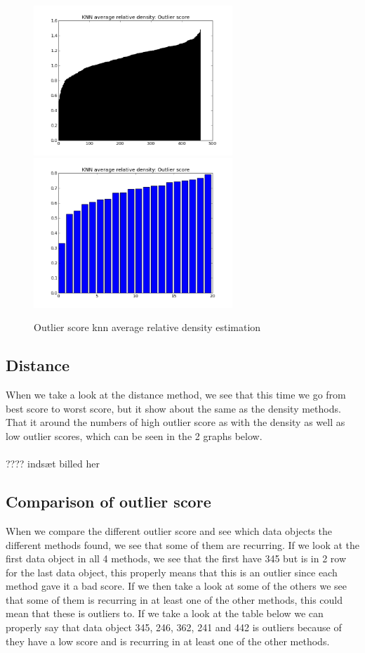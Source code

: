 \begin{figure}[H]
\centering
\includegraphics[width=7.5cm, keepaspectratio=true]{pictures/knnAvgdensityEstimationAll.png}
\includegraphics[width=7.5cm, keepaspectratio=true]{pictures/knnAvgdensityEstimation20.png}
\vspace{-0.4cm}
\caption{\footnotesize Outlier score knn average relative density estimation}
\label{avg}
\end{figure}

\subsection{Distance}

When we take a look at the distance method, we see that this time we go from best score to worst score, but it show about the same as the density methods. That it around the numbers of high outlier score as with the density as well as low outlier scores, which can be seen in the 2 graphs below.
\\\\
???? indsæt billed her

\subsection{Comparison of outlier score}

When we compare the different outlier score and see which data objects the different methods found, we see that some of them are recurring. If we look at the first data object in all 4 methods, we see that the first have 345 but is in 2 row for the last data object, this properly means that this is an outlier since each method gave it a bad score. If we then take a look at some of the others we see that some of them is recurring in at least one of the other methods, this could mean that these is outliers to. If we take a look at the table below we can properly say that data object 345, 246, 362, 241 and 442 is outliers because of they have a low score and is recurring in at least one of the other methods.

